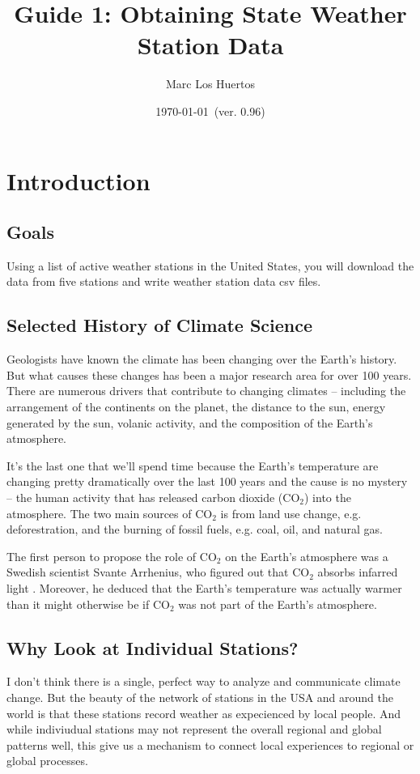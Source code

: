 \documentclass{article}\usepackage[]{graphicx}\usepackage[dvipsnames]{xcolor}
\title{Guide 1: Obtaining State Weather Station Data}
\author{Marc Los Huertos}
\date{\today~(ver. 0.96)}
\begin{document}
\maketitle

\section{Introduction}

\subsection{Goals}

Using a list of active weather stations in the United States, you  will download the data from five stations and write weather station data csv files. 

\subsection{Selected History of Climate Science}

Geologists have known the climate has been changing over the Earth's history. But what causes these changes has been a major research area for over 100 years. There are numerous drivers that contribute to changing climates -- including the arrangement of the continents on the planet, the distance to the sun, energy generated by the sun, volanic activity, and the composition of the Earth's atmosphere. 

It's the last one that we'll spend time because the Earth's temperature are changing pretty dramatically over the last 100 years and the cause is no mystery -- the human activity that has released carbon dioxide (CO$_2$) into the atmosphere. The two main sources of CO$_2$ is from land use change, e.g. deforestration, and the burning of fossil fuels, e.g. coal, oil, and natural gas. 

The first person to propose the role of CO$_2$ on the Earth's atmosphere was a Swedish scientist Svante Arrhenius, who figured out that CO$_2$ absorbs infarred light \citep{rodhe1997svante}. Moreover, he deduced that the Earth's temperature was actually warmer than it might otherwise be if CO$_2$ was not part of the Earth's atmosphere. 

\subsection{Why Look at Individual Stations?}

I don't think there is a single, perfect way to analyze and communicate climate change. But the beauty of the network of stations in the USA and around the world is that these stations record weather as expecienced by local people. And while indiviudual stations may not represent the overall regional and global patterns well, this give us a mechanism to connect local experiences to regional or global processes. 
\end{document}
